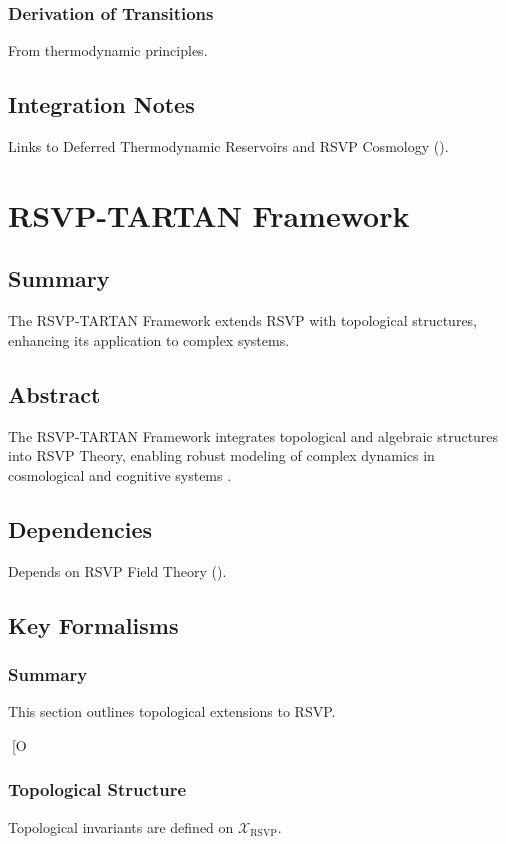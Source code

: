 \documentclass[11pt,oneside]{memoir}
\theoremstyle{plain}
\newcommand{\X}{\mathcal{X}}
\begin{document}
\subsection{Derivation of Transitions}
From thermodynamic principles.

\section{Integration Notes}
Links to Deferred Thermodynamic Reservoirs and RSVP Cosmology ().

\chapter{RSVP-TARTAN Framework}
\label{sec:rsvp_tartan}

\section{Summary}
The RSVP-TARTAN Framework extends RSVP with topological structures, enhancing its application to complex systems.

\section{Abstract}
The RSVP-TARTAN Framework integrates topological and algebraic structures into RSVP Theory, enabling robust modeling of complex dynamics in cosmological and cognitive systems \cite{lurie}.

\section{Dependencies}
Depends on RSVP Field Theory ().

\section{Key Formalisms}
\subsection{Summary}
This section outlines topological extensions to RSVP.

[O\subsection{Topological Structure}
Topological invariants are defined on \(\X_{\mathrm{RSVP}}\).
\end{document}
